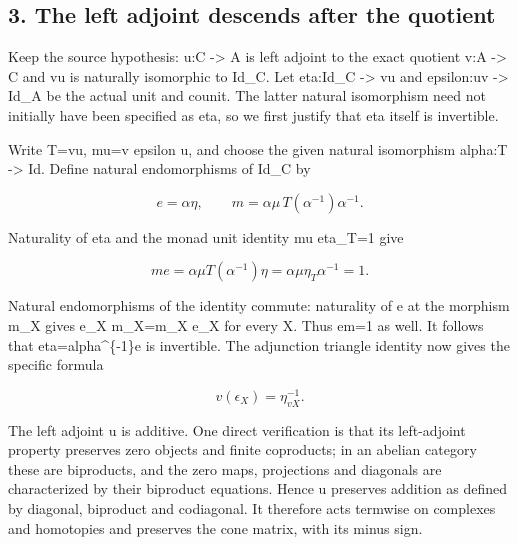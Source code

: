 \documentclass[11pt]{article}
\begin{document}
\subsection{3. The left adjoint descends after the quotient}\label{proofs-5910-6199-the-left-adjoint-descends-after-the-quotient}

Keep the source hypothesis:\allowbreak{} u:\allowbreak{}C \allowbreak{}-> A is left adjoint to the exact quotient v:\allowbreak{}A \allowbreak{}-> C and vu is naturally isomorphic to Id\_\allowbreak{}C. Let eta:\allowbreak{}Id\_\allowbreak{}C \allowbreak{}-> vu and epsilon:\allowbreak{}uv \allowbreak{}-> Id\_\allowbreak{}A be the actual unit and counit. The latter natural isomorphism need not initially have been specified as eta,\allowbreak{} so we first justify that eta itself is invertible.

Write T\allowbreak{}=vu,\allowbreak{} mu\allowbreak{}=v epsilon u,\allowbreak{} and choose the given natural isomorphism alpha:\allowbreak{}T \allowbreak{}-> Id. Define natural endomorphisms of Id\_\allowbreak{}C by

\[
 e=\alpha\eta,\qquad
 m=\alpha\mu\,T(\alpha^{-1})\alpha^{-1}.                 \tag{3.1}
\]

Naturality of eta and the monad unit identity mu eta\_\allowbreak{}T\allowbreak{}=1 give

\[
 me=\alpha\mu T(\alpha^{-1})\eta
    =\alpha\mu\eta_T\alpha^{-1}=1.
\]

Natural endomorphisms of the identity commute:\allowbreak{} naturality of e at the morphism m\_\allowbreak{}X gives e\_\allowbreak{}X m\_\allowbreak{}X\allowbreak{}=m\_\allowbreak{}X e\_\allowbreak{}X for every X. Thus em\allowbreak{}=1 as well. It follows that eta\allowbreak{}=alpha\textasciicircum{}\{-1\}e is invertible. The adjunction triangle identity now gives the specific formula

\[
 v(\epsilon_X)=\eta_{vX}^{-1}.                            \tag{3.2}
\]

The left adjoint u is additive. One direct verification is that its left-adjoint property preserves zero objects and finite coproducts; in an abelian category these are biproducts,\allowbreak{} and the zero maps,\allowbreak{} projections and diagonals are characterized by their biproduct equations. Hence u preserves addition as defined by diagonal,\allowbreak{} biproduct and codiagonal. It therefore acts termwise on complexes and homotopies and preserves the cone matrix,\allowbreak{} with its minus sign.
\end{document}
